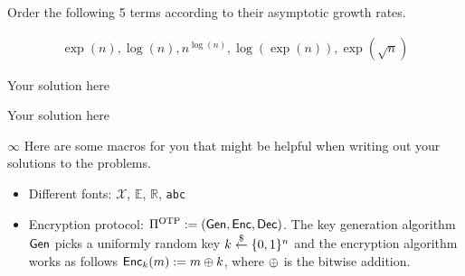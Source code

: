\documentclass[a4paper,10pt]{article}
\begin{document}

\begin{question}{1}
Order the following 5 terms according to their asymptotic growth
rates.

\begin{align*}
\exp(n), \log(n), n^{\log(n)}, \log(\exp(n)), \exp(\sqrt{n})
\end{align*}

Your solution here
\end{question}

\begin{question}{5}
Your solution here
\end{question}

\begin{question}{$\infty$}
Here are some macros for you that might be helpful when writing out your solutions to the problems.

\begin{itemize}
\item Different fonts: $\mathcal{X}$, $\mathbb{E}$, $\mathbb{R}$, \texttt{abc}
\item Encryption protocol: $\Pi^{\text{OTP}}:=\left( \mathsf{Gen}, \mathsf{Enc}, \mathsf{Dec} \right)$. The key generation algorithm $\mathsf{Gen}$ picks a uniformly random key $k\overset{\$}{\gets}\{0,1\}^n$ and the encryption algorithm works as follows $\mathsf{Enc}_k(m):=m\oplus k$, where $\oplus$ is the bitwise addition.
\end{itemize}


\end{question}
\end{document}

